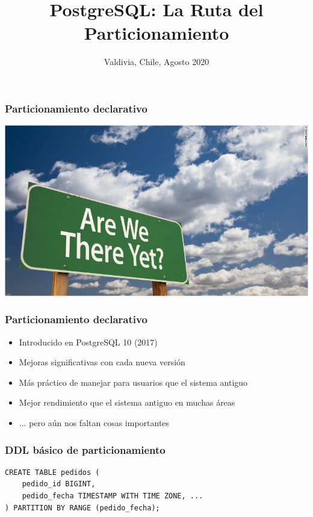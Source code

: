 \documentclass[ignorenonframetext,t]{beamer}
\institute{2ndQuadrant -- Professional PostgreSQL}
\date{Valdivia, Chile, Agosto 2020}
\title{PostgreSQL: La Ruta del Particionamiento}
\begin{document}
  \begin{frame}[plain]
    \titlepage
  \end{frame}

\begin{frame}
	\frametitle{Particionamiento declarativo}

	\center \includegraphics{are_we_there_yet_1.jpg}

\end{frame}

\begin{frame}

	\frametitle{Particionamiento declarativo}

	\begin{itemize}
		\item Introducido en PostgreSQL 10 (2017)
		\item Mejoras significativas con cada nueva versión
		\item Más práctico de manejar para usuarios que el sistema antiguo
		\item Mejor rendimiento que el sistema antiguo en muchas áreas
			\pause
		\item ... pero aún nos faltan cosas importantes
	\end{itemize}
\end{frame}

\begin{frame}[fragile]
	\frametitle{DDL básico de particionamiento}
\begin{lstlisting}
CREATE TABLE pedidos (
    pedido_id BIGINT,
    pedido_fecha TIMESTAMP WITH TIME ZONE, ...
) PARTITION BY RANGE (pedido_fecha);
	\end{lstlisting}
\end{frame}
\end{document}

